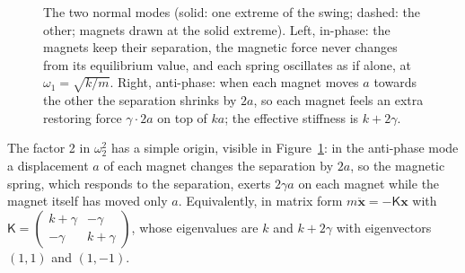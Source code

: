 \documentclass[11pt,a4paper]{article}
\newcommand{\magnetSN}[4]{%
  \fill[magnetS] (#1,#2) rectangle ({#1+#3/2},{#2+#4});
  \fill[magnetN] ({#1+#3/2},#2) rectangle ({#1+#3},{#2+#4});
  \node[white,font=\tiny] at ({#1+#3/4},{#2+#4/2}) {S};
  \node[white,font=\tiny] at ({#1+3*#3/4},{#2+#4/2}) {N};}
\newcommand{\magnetNS}[4]{%
  \fill[magnetN] (#1,#2) rectangle ({#1+#3/2},{#2+#4});
  \fill[magnetS] ({#1+#3/2},#2) rectangle ({#1+#3},{#2+#4});
  \node[white,font=\tiny] at ({#1+#3/4},{#2+#4/2}) {N};
  \node[white,font=\tiny] at ({#1+3*#3/4},{#2+#4/2}) {S};}
\begin{document}
\begin{figure}[htbp]
\centering
{}
\caption{The two normal modes (solid: one extreme of the swing; dashed: the other; magnets drawn at the solid extreme). Left, in-phase: the magnets keep their separation, the magnetic force never changes from its equilibrium value, and each spring oscillates as if alone, at $\omega_1=\sqrt{k/m}$. Right, anti-phase: when each magnet moves $a$ towards the other the separation shrinks by $2a$, so each magnet feels an extra restoring force $\gamma\cdot2a$ on top of $ka$; the effective stiffness is $k+2\gamma$.}
\label{fig:modes}
\end{figure}

The factor 2 in $\omega_2^2$ has a simple origin, visible in Figure~\ref{fig:modes}: in the anti-phase mode a displacement $a$ of each magnet changes the separation by $2a$, so the magnetic spring, which responds to the separation, exerts $2\gamma a$ on each magnet while the magnet itself has moved only $a$. Equivalently, in matrix form $m\ddot{\bm x}=-\mathsf K\bm x$ with $\mathsf K=\begin{pmatrix}k+\gamma&-\gamma\\-\gamma&k+\gamma\end{pmatrix}$, whose eigenvalues are $k$ and $k+2\gamma$ with eigenvectors $(1,1)$ and $(1,-1)$.
\end{document}
